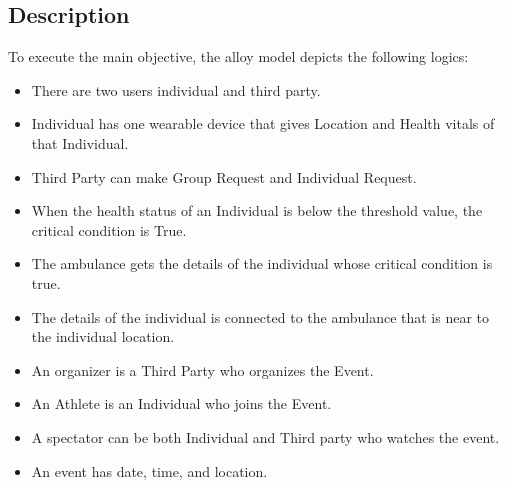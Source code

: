 \subsection{Description}
To execute the main objective, the alloy model depicts the following logics:
\begin{itemize}
\item There are two users individual and third party.
\item Individual has one wearable device that gives Location and Health vitals of that Individual.
\item Third Party can make Group Request and Individual Request.
\item When the health status of an Individual is below the threshold value, the critical condition is True.
\item The ambulance gets the details of the individual whose critical condition is true.
\item The details of the individual is connected to the ambulance that is near to the individual location.
\item An organizer is a Third Party who organizes the Event.
\item An Athlete is an Individual who joins the Event.
\item A spectator can be both Individual and Third party who watches the event.
\item An event has date, time, and location.
\end{itemize}
